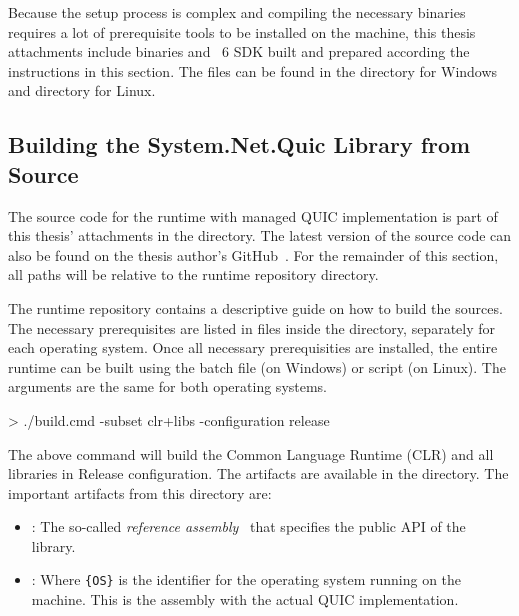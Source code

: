 Because the setup process is complex and compiling the necessary binaries requires a lot of
prerequisite tools to be installed on the machine, this thesis attachments include binaries and
\dotnet{}~6 SDK built and prepared according the instructions in this section. The files can be
found in the  directory for Windows and  directory
for Linux.

\subsection{Building the System.Net.Quic Library from Source}\label{sec:06-build-runtime}

The source code for the \dotnet{} runtime with managed QUIC implementation is part of this thesis'
attachments in the  directory. The latest version of the source code
can also be found on the thesis author's GitHub~\cite{githubRzikmRuntimelab}. For the remainder of
this section, all paths will be relative to the \dotnet{} runtime repository directory.

The \dotnet{} runtime repository contains a descriptive guide on how to build the sources. The
necessary prerequisites are listed in files inside the 
directory, separately for each operating system. Once all necessary prerequisities are installed,
the entire \dotnet{} runtime can be built using the  batch file (on Windows) or
 script (on Linux). The arguments are the same for both operating systems.

\begin{myVerbatim}
> ./build.cmd -subset clr+libs -configuration release
\end{myVerbatim}

The above command will build the Common Language Runtime (CLR) and all libraries in Release
configuration. The artifacts are available in the 
directory. The important artifacts from this directory are:

\begin{itemize}

  \item {}: The so-called \textit{reference
assembly}~\cite{ReferenceAssemblyDocs} that specifies the public API of the library.

  \item {}: Where \verb|{OS}| is the identifier for
the operating system running on the machine. This is the \dotnet{} assembly with the actual QUIC
implementation.

\end{itemize}

